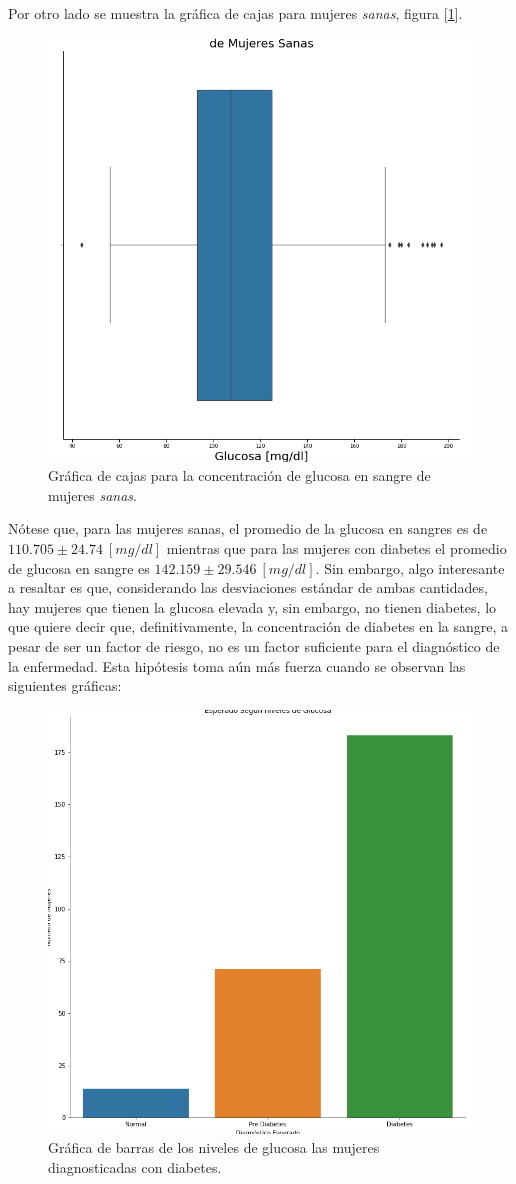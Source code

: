 \documentclass{article}
\begin{document}
Por otro lado se muestra la gráfica de cajas para mujeres \emph{sanas}, figura [\ref{fig:glucosa_sanas}].

\begin{figure}[H]
	\centering
	\includegraphics[width=0.65\linewidth]{glucosa_sanas.png}
	\caption{Gráfica de cajas para la concentración de glucosa en sangre de mujeres \emph{sanas}.}%
	\label{fig:glucosa_sanas}
\end{figure}

Nótese que, para las mujeres sanas, el promedio de la glucosa en sangres es de $110.705\pm24.74\ [mg/dl]$ mientras que  para las mujeres con diabetes el promedio de glucosa en sangre es $142.159\pm29.546\ [mg/dl]$. Sin embargo, algo interesante a resaltar es que, considerando las desviaciones estándar de ambas cantidades, hay mujeres que tienen la glucosa elevada y, sin embargo, no tienen diabetes, lo que quiere decir que, definitivamente, la concentración de diabetes en la sangre, a pesar de ser un factor de riesgo, no es un factor suficiente para el diagnóstico de la enfermedad. Esta hipótesis toma aún más fuerza cuando se observan las siguientes gráficas:

\begin{figure}[H]
	\centering
	\includegraphics[width=0.65\linewidth]{glucosa_bar_diabetes.png}
	\caption{Gráfica de barras de los niveles de glucosa las mujeres diagnosticadas con diabetes.}%
	\label{fig:glucosa_bar_diabetes}
\end{figure}
\end{document}

